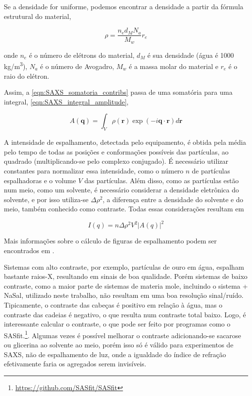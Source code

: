 		Se a densidade for uniforme, podemos encontrar a densidade a partir da fórmula estrutural do material, \cite{Narayanan2008a}
		
		\begin{equation}
			\rho = \dfrac{n_e d_M N_a}{M_w} r_e
			\label{eqn:rho_uniforme}
		\end{equation}
		
		\noindent onde \(n_e\) é o número de elétrons do material, \(d_M\) é sua densidade (água é 1000 kg/m\textsuperscript{3}), \(N_a\) é o número de Avogadro, \(M_w\) é a massa molar do material e \(r_e\) é o raio do elétron.
		
		Assim, a \autoref{eqn:SAXS_somatoria_contribs} passa de uma somatória para uma integral, \autoref{eqn:SAXS_integral_amplitude}, \cite{Narayanan2008a}
		
		\begin{equation}
			A(\mathbf{q}) = \int_V \rho(\mathbf{r}) \exp(-i \mathbf{q} \cdot \mathbf{r}) d\mathbf{r}
			\label{eqn:SAXS_integral_amplitude}
		\end{equation}
		
		A intensidade de espalhamento, detectada pelo equipamento, é obtida pela média pelo tempo de todas as posições e conformações possíveis das partículas, ao quadrado (multiplicando-se pelo complexo conjugado).\cite{Pecora2008a} É necessário utilizar constantes para normalizar essa intensidade, como o número \(n\) de partículas espalhadoras e o volume \(V\) das partículas. Além disso, como as partículas estão num meio, como um solvente, é necessário considerar a densidade eletrônica do solvente, e por isso utiliza-se \(\Delta \rho^2\), a diferença entre a densidade do solvente e do meio, também conhecido como contraste. Todas essas considerações resultam em\cite{Pedersen_Aula1}
		
		\begin{equation}
		I(q) = n\Delta \rho^2 V^2 |A(q)|^2
		\label{eqn:SAXS_I_funcao_A}
		\end{equation}

		Mais informações sobre o cálculo de figuras de espalhamento podem ser encontrados em \citeauthor{Alves2017}.
		
		Sistemas com alto contraste, por exemplo, partículas de ouro em água, espalham bastante raios-X, resultando em sinais de boa qualidade. Porém sistemas de baixo contraste, como a maior parte de sistemas de materia mole, incluindo o sistema \CTAB{} + NaSal, utilizado neste trabalho, não resultam em uma boa resolução sinal/ruído. Tipicamente, o contraste das cabeças é positivo em relação à água, mas o contraste das cadeias é negativo, o que resulta num contraste total baixo. Logo, é interessante calcular o contraste, o que pode ser feito por programas como o SASfit.\footnote{\url{https://github.com/SASfit/SASfit}}. Algumas vezes é possível melhorar o contraste adicionando-se sacarose ou glicerina ao solvente ao meio, porém isso só é válido para experimentos de SAXS, não de espalhamento de luz, onde a igualdade do índice de refração efetivamente faria os agregados serem invisíveis.
		
